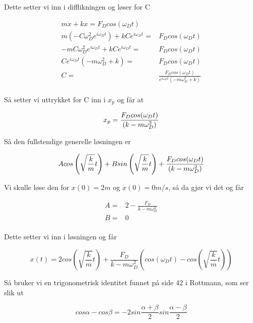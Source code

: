 \documentclass[norsk,a4paper,12pt]{article}
\begin{document}
Dette setter vi inn i difflikningen og løser for C

\begin{align*}
	m\ddot{x} + kx = F_D cos(\omega_Dt)\\
	m\left(-C\omega_D^2e^{i\omega_Dt} \right) + k Ce^{i\omega_Dt} =& F_Dcos(\omega_Dt)\\
	-mC\omega_D^2e^{i\omega_Dt} + k Ce^{i\omega_Dt} =& F_Dcos(\omega_Dt)\\
	Ce^{i\omega_Dt} \left(-m\omega_D^2 +k \right) =& F_Dcos(\omega_Dt)\\
	C =& \frac{F_Dcos(\omega_Dt)}{e^{i\omega_Dt} \left(-m\omega_D^2 +k \right)}\\
\end{align*}

Så setter vi uttrykket for C inn i $x_p$ og får at

\begin{equation}
	x_p = \frac{F_Dcos(\omega_Dt)\\}{\left(k - m \omega_D^2 \right)}
\end{equation}

Så den fullstendige generelle løsningen er

\begin{equation}
	A cos \left(\sqrt{\frac{k}{m}}t \right) +B sin \left(\sqrt{\frac{k}{m}}t \right) + \frac{F_Dcos(\omega_Dt)\\}{\left(k - m \omega_D^2 \right)}
\end{equation}

Vi skulle løse den for $x(0)=2m$ og $\dot{x}(0)=0 m/s$, så da gjør vi det og får 

\begin{align*}
	A =& 2 - \frac{F_D}{k-m\omega_D^2}\\
	B =& 0\\ 
\end{align*}

Dette setter vi inn i løsningen og får

\begin{equation}
	x(t) = 2 cos \left(\sqrt{\frac{k}{m}}t \right) + \frac{F_D}{k-m\omega_D^2} \left(cos(\omega_Dt)-cos \left(\sqrt{\frac{k}{m}}t \right) \right)
\end{equation}

Så bruker vi en trigonometrisk identitet funnet på side 42 i Rottmann, som ser slik ut

\begin{equation}
	cos \alpha - cos \beta = -2 sin\frac{\alpha + \beta}{2}sin\frac{\alpha -\beta}{2}
\end{equation}
\end{document}
